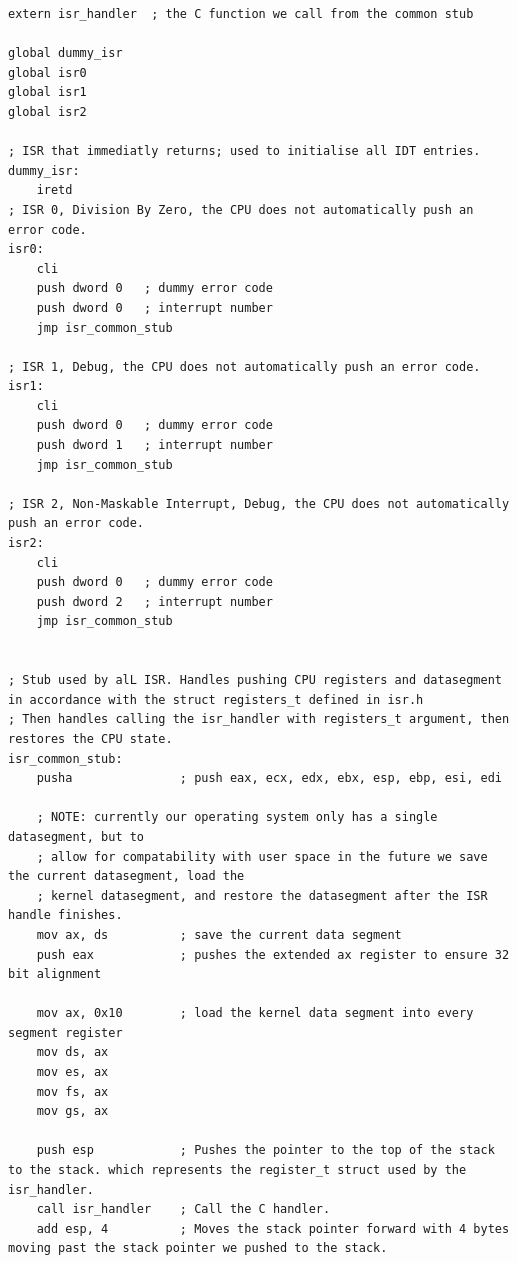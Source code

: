 \documentclass[../main.tex]{subfiles}
\begin{document}
\label{lst:isr_asm}
\begin{verbatim}
extern isr_handler  ; the C function we call from the common stub

global dummy_isr
global isr0
global isr1
global isr2

; ISR that immediatly returns; used to initialise all IDT entries.
dummy_isr: 
	iretd
; ISR 0, Division By Zero, the CPU does not automatically push an error code.
isr0:
    cli
    push dword 0   ; dummy error code
    push dword 0   ; interrupt number
    jmp isr_common_stub

; ISR 1, Debug, the CPU does not automatically push an error code.
isr1:
    cli
    push dword 0   ; dummy error code
    push dword 1   ; interrupt number
    jmp isr_common_stub

; ISR 2, Non-Maskable Interrupt, Debug, the CPU does not automatically push an error code.
isr2:
    cli
    push dword 0   ; dummy error code
    push dword 2   ; interrupt number
    jmp isr_common_stub


; Stub used by alL ISR. Handles pushing CPU registers and datasegment in accordance with the struct registers_t defined in isr.h
; Then handles calling the isr_handler with registers_t argument, then restores the CPU state.
isr_common_stub:
    pusha               ; push eax, ecx, edx, ebx, esp, ebp, esi, edi

	; NOTE: currently our operating system only has a single datasegment, but to
	; allow for compatability with user space in the future we save the current datasegment, load the
	; kernel datasegment, and restore the datasegment after the ISR handle finishes.
    mov ax, ds          ; save the current data segment
    push eax            ; pushes the extended ax register to ensure 32 bit alignment

    mov ax, 0x10        ; load the kernel data segment into every segment register
    mov ds, ax
    mov es, ax
    mov fs, ax
    mov gs, ax

    push esp            ; Pushes the pointer to the top of the stack to the stack. which represents the register_t struct used by the isr_handler.
    call isr_handler    ; Call the C handler.
    add esp, 4          ; Moves the stack pointer forward with 4 bytes moving past the stack pointer we pushed to the stack.


\end{verbatim}
\end{document}
